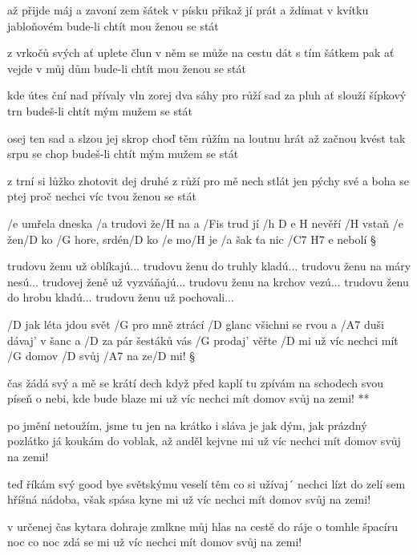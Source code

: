 až přijde máj a zavoní zem
šátek v písku přikaž jí prát
a ždímat v kvítku jabloňovém
bude-li chtít mou ženou se stát \s

z vrkočů svých ať uplete člun
v něm se může na cestu dát
s tím šátkem pak ať vejde v můj dům
bude-li chtít mou ženou se stát \s

kde útes ční nad přívaly vln
zorej dva sáhy pro růží sad
za pluh ať slouží šípkový trn
budeš-li chtít mým mužem se stát \s

osej ten sad a slzou jej skrop
choď těm růžím na loutnu hrát
až začnou kvést tak srpu se chop
budeš-li chtít mým mužem se stát \s

z trní si lůžko zhotovit dej
druhé z růží pro mě nech stlát
jen pýchy své a boha se ptej
proč nechci víc tvou ženou se stát




/e umřela dneska /a trudovi že/H na a /Fis trud jí /{h D e H} nevěří
/H vstaň /e žen/D ko /G hore, srdén/D ko /e mo/H je
/a šak ťa nic /{C7 H7 e} nebolí \S

trudovu ženu už oblíkajú...
trudovu ženu do truhly kladú...
trudovu ženu na máry nesú...
trudovej ženě už vyzváňajú...
trudovu ženu na krchov vezú...
trudovu ženu do hrobu kladú...
trudovu ženu už pochovali...




/D jak léta jdou svět /G pro mně ztrácí /D glanc
všichni se rvou a /A7 duši dávaj' v šanc
a /D za pár šestáků vás /G prodaj' věřte /D mi
už víc nechci mít /G domov /D svůj /A7 na ze/D mi! \S

\R čas žádá svý a mě se krátí dech
   když před kaplí tu zpívám na schodech
   svou píseň o nebi, kde bude blaze mi
   už víc nechci mít domov svůj na zemi! **

po jmění netoužím, jsme tu jen na krátko
i sláva je jak dým, jak prázdný pozlátko
já koukám do voblak, až anděl kejvne mi
už víc nechci mít domov svůj na zemi! \s

teď říkám svý good bye světskýmu veselí
těm co si užívaj´ nechci lízt do zelí
sem hříšná nádoba, však spása kyne mi
už víc nechci mít domov svůj na zemi! \s

v určenej čas kytara dohraje
zmlkne můj hlas na cestě do ráje
o tomhle špacíru noc co noc zdá se mi
už víc nechci mít domov svůj na zemi! \s





